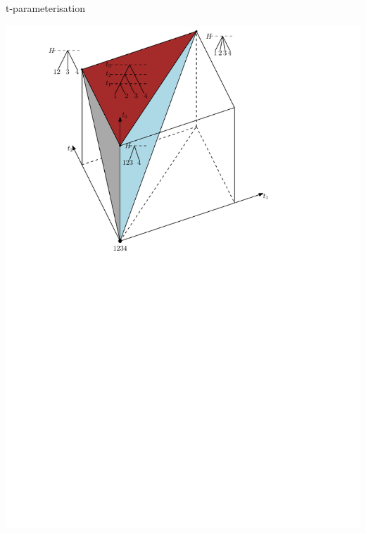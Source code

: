 \documentclass{beamer}
\renewcommand{\t}{$\mathrm{t}$}
\theoremstyle{example}
\begin{document}
\begin{frame}{\t-parameterisation}
\begin{definition}
\begin{center}
\includegraphics[width=0.65\framewidth]{simplex}
\end{center}
\end{definition}
\end{frame}
\end{document}
